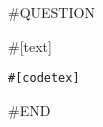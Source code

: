 \documentclass[a4paper]{article}
\newenvironment{exercise}{
  \begin{framed}}{
  \end{framed}}
\begin{document}
#QUESTION
\begin{exercise}
\noindent #[text]
\begin{lstlisting}[language=MyJava]
#[codetex]
\end{lstlisting}
\end{exercise}
\clearpage
#END
\end{document}
